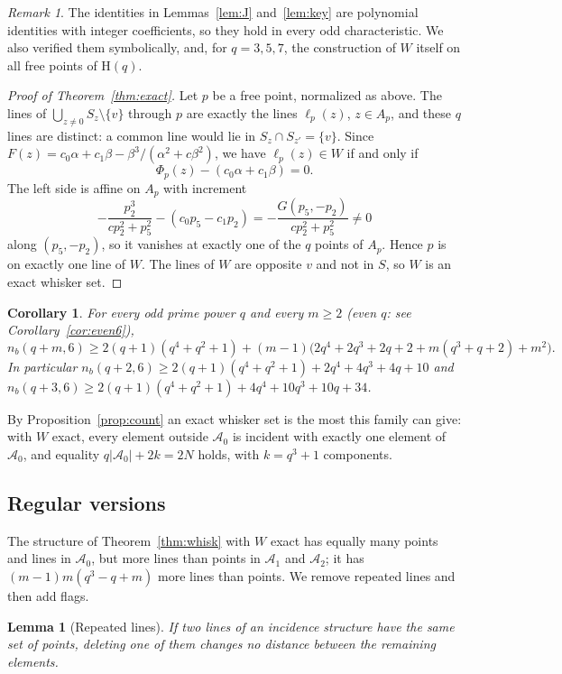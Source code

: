 \documentclass[11pt]{amsart}
\newtheorem{lemma}[theorem]{Lemma}
\newtheorem{corollary}[theorem]{Corollary}
\theoremstyle{definition}
\theoremstyle{remark}
\newtheorem{remark}[theorem]{Remark}
\newcommand{\cA}{\mathcal{A}}
\newcommand{\Hq}{\mathrm{H}}
\begin{document}
\begin{remark}
The identities in Lemmas~\ref{lem:J} and~\ref{lem:key} are polynomial identities with integer coefficients, so they hold in every odd characteristic. We also verified them symbolically, and, for $q=3,5,7$, the construction of $W$ itself on all free points of $\Hq(q)$.
\end{remark}

\begin{proof}[Proof of Theorem~\ref{thm:exact}]
Let $p$ be a free point, normalized as above. The lines of $\bigcup_{z\ne0}S_z\setminus\{v\}$ through $p$ are exactly the lines $\ell_p(z)$, $z\in A_p$, and these $q$ lines are distinct: a common line would lie in $S_z\cap S_{z'}=\{v\}$. Since $F(z)=c_0\alpha+c_1\beta-\beta^3/(\alpha^2+c\beta^2)$, we have $\ell_p(z)\in W$ if and only if
\[
\Phi_p(z)-(c_0\alpha+c_1\beta)=0 .
\]
The left side is affine on $A_p$ with increment
\[
-\frac{p_2^3}{cp_2^2+p_5^2}-(c_0p_5-c_1p_2)=-\frac{G(p_5,-p_2)}{cp_2^2+p_5^2}\ne0
\]
along $(p_5,-p_2)$, so it vanishes at exactly one of the $q$ points of $A_p$. Hence $p$ is on exactly one line of $W$. The lines of $W$ are opposite $v$ and not in $S$, so $W$ is an exact whisker set.
\end{proof}

\begin{corollary}\label{cor:d6}
For every odd prime power $q$ and every $m\ge2$ \textup{(}even $q$: see Corollary~\ref{cor:even6}\textup{)},
\[
n_b(q+m,6)\ge2(q+1)(q^4+q^2+1)+(m-1)\bigl(2q^4+2q^3+2q+2+m(q^3+q+2)+m^2\bigr).
\]
In particular $n_b(q+2,6)\ge2(q+1)(q^4+q^2+1)+2q^4+4q^3+4q+10$ and $n_b(q+3,6)\ge2(q+1)(q^4+q^2+1)+4q^4+10q^3+10q+34$.
\end{corollary}

By Proposition~\ref{prop:count} an exact whisker set is the most this family can give: with $W$ exact, every element outside $\cA_0$ is incident with exactly one element of $\cA_0$, and equality $q|\cA_0|+2k=2N$ holds, with $k=q^3+1$ components.

\subsection{Regular versions}
The structure of Theorem~\ref{thm:whisk} with $W$ exact has equally many points and lines in $\cA_0$, but more lines than points in $\cA_1$ and $\cA_2$; it has $(m-1)m(q^3-q+m)$ more lines than points. We remove repeated lines and then add flags.

\begin{lemma}[Repeated lines]\label{lem:twin}
If two lines of an incidence structure have the same set of points, deleting one of them changes no distance between the remaining elements.
\end{lemma}
\end{document}
